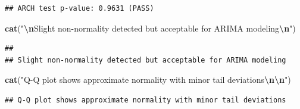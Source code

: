 \documentclass[
]{article}
\newenvironment{Shaded}{\begin{snugshade}}{\end{snugshade}}
\newcommand{\AttributeTok}[1]{\textcolor[rgb]{0.13,0.29,0.53}{#1}}
\newcommand{\CommentTok}[1]{\textcolor[rgb]{0.56,0.35,0.01}{\textit{#1}}}
\newcommand{\DecValTok}[1]{\textcolor[rgb]{0.00,0.00,0.81}{#1}}
\newcommand{\FloatTok}[1]{\textcolor[rgb]{0.00,0.00,0.81}{#1}}
\newcommand{\FunctionTok}[1]{\textcolor[rgb]{0.13,0.29,0.53}{\textbf{#1}}}
\newcommand{\NormalTok}[1]{#1}
\newcommand{\OtherTok}[1]{\textcolor[rgb]{0.56,0.35,0.01}{#1}}
\newcommand{\SpecialCharTok}[1]{\textcolor[rgb]{0.81,0.36,0.00}{\textbf{#1}}}
\newcommand{\StringTok}[1]{\textcolor[rgb]{0.31,0.60,0.02}{#1}}
\begin{document}
\begin{Shaded}
\end{Shaded}

\begin{verbatim}
## ARCH test p-value: 0.9631 (PASS)
\end{verbatim}

\begin{Shaded}
\begin{Highlighting}[]
\FunctionTok{cat}\NormalTok{(}\StringTok{"}\SpecialCharTok{\textbackslash{}n}\StringTok{Slight non{-}normality detected but acceptable for ARIMA modeling}\SpecialCharTok{\textbackslash{}n}\StringTok{"}\NormalTok{)}
\end{Highlighting}
\end{Shaded}

\begin{verbatim}
## 
## Slight non-normality detected but acceptable for ARIMA modeling
\end{verbatim}

\begin{Shaded}
\begin{Highlighting}[]
\FunctionTok{cat}\NormalTok{(}\StringTok{"Q{-}Q plot shows approximate normality with minor tail deviations}\SpecialCharTok{\textbackslash{}n\textbackslash{}n}\StringTok{"}\NormalTok{)}
\end{Highlighting}
\end{Shaded}

\begin{verbatim}
## Q-Q plot shows approximate normality with minor tail deviations
\end{verbatim}
\end{document}
